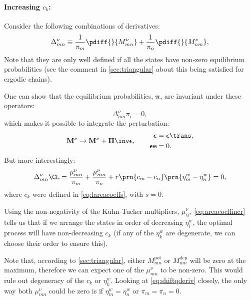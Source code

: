 \documentclass[12pt]{article}
\newcommand{\onev}{\mathbf{e}}
\newcommand{\eqm}{\pi}
\newcommand{\eq}{\boldsymbol{\eqm}}
\newcommand{\Eqm}{\Pi}
\newcommand{\Eq}{\boldsymbol{\Eqm}}
\newcommand{\etwm}{\eta^w}
\newcommand{\MMdm}{M}
\newcommand{\MMd}{\mathbf{\MMdm}}
\newcommand{\pot}{^{\text{pot}}}
\newcommand{\dep}{^{\text{dep}}}
\begin{document}
\paragraph{Increasing \texorpdfstring{$c_k$}{c(k)}:}\label{sec:areacoeffincr}

Consider the following combinations of derivatives:
%
\begin{equation}\label{eq:areacoeffincrderiv}
    \Delta^\nu_{mn} \equiv
      \frac{1}{\eqm_m} \pdiff{}{\MMdm^\nu_{mn}}
      + \frac{1}{\eqm_n} \pdiff{}{\MMdm^\nu_{nm}}, 
\end{equation}
%
Note that they are only well defined if all the states have non-zero equilibrium probabilities (see the comment in \cref{sec:triangular} about this being satisfied for ergodic chains).

One can show that the equilibrium probabilities, $\eq$, are invariant under these operators:
%
\begin{equation}\label{eq:sareacoeffincrprob}
  \Delta^\nu_{mn} \eqm_i = 0,
\end{equation}
%
which makes it possible to integrate the perturbation:
%
\begin{equation}\label{eq:areacoeffincrfinite}
  \MMd^\nu \to \MMd^\nu + \Eq\inv \boldsymbol{\epsilon},
  \qquad
  \begin{aligned}
  \boldsymbol{\epsilon} &= \boldsymbol{\epsilon}\trans,
  \\
  \boldsymbol{\epsilon} \onev &= 0.
  \end{aligned}
\end{equation}
%
But more interestingly:
%
\begin{equation}\label{eq:areacoeffincr}
    \Delta^\nu_{mn}\CL =
      \frac{\mu^\nu_{mn}}{\eqm_m} + \frac{\mu^\nu_{nm}}{\eqm_n}
      + r \prn{c_m - c_n}\prn{\etwm_m - \etwm_n} = 0,
\end{equation}
%
where $c_k$ were defined in \cref{eq:lareacoeffs}, with \(s = 0\).

Using the non-negativity of the Kuhn-Tucker multipliers, $\mu^\nu_{ij}$, \cref{eq:areacoeffincr} tells us that if we arrange the states in order of decreasing $\etwm_i$, the optimal process will have non-decreasing $c_k$ (if any of the $\etwm_k$ are degenerate, we can choose their order to ensure this).

Note that, according to \cref{sec:triangular}, either $\MMdm\pot_{mn}$ or $\MMdm\dep_{mn}$ will be zero at the maximum, therefore we can expect one of the $\mu^\nu_{mn}$ to be non-zero.
This would rule out degeneracy of the $c_k$ or $\etwm_k$.
Looking at \cref{eq:shiftqderiv} closely, the only way both $\mu^\nu_{mn}$ could be zero is if $\etwm_m = \etwm_n$ or $\eqm_m = \eqm_n = 0$.
\end{document}

